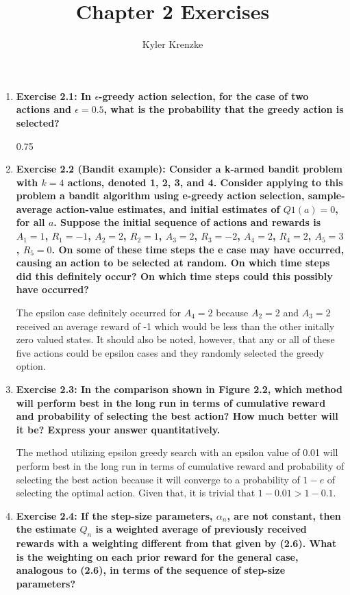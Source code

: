 \documentclass[11pt]{article}
\title{Chapter 2 Exercises}
\author{Kyler Krenzke}
\date{}
\begin{document}
	\maketitle

	\begin{enumerate}
		\item \textbf{Exercise 2.1: In $\epsilon$-greedy action selection, for the case of two actions and $\epsilon=0.5$, what is the probability that the greedy action is
		selected?}

		0.75
		
		\item \textbf{Exercise 2.2 (Bandit example): Consider a k-armed bandit problem with $k=4$ actions, denoted 1, 2, 3, and 4. Consider applying to this problem a bandit
		algorithm using e-greedy action selection, sample-average action-value estimates, and initial estimates of $Q1(a)=0$, for all $a$. Suppose the initial sequence of actions
		and rewards is $A_1=1$, $R_1=-1$, $A_2=2$, $R_2=1$, $A_3=2$, $R_3=-2$, $A_4=2$, $R_4=2$, $A_5=3$, $R_5=0$. On some of these time steps the e case may have occurred,
		causing an action to be selected at random. On which time steps did this definitely occur? On which time steps could this possibly have occurred?}

		The epsilon case definitely occurred for $A_4=2$ because $A_2=2$ and $A_3=2$ received an average reward of -1 which would be less than the other initally zero valued
		states. It should also be noted, however, that any or all of these five actions could be epsilon cases and they randomly selected the greedy option.
		
		\item \textbf{Exercise 2.3: In the comparison shown in Figure 2.2, which method will perform best in the long run in terms of cumulative reward and probability of
		selecting the best action? How much better will it be? Express your answer quantitatively.}
		
		The method utilizing epsilon greedy search with an epsilon value of 0.01 will perform best in the long run in terms of cumulative reward and probability of selecting the
		best action because it will converge to a probability of $1-e$ of selecting the optimal action. Given that, it is trivial that $1-0.01 > 1-0.1$.
		
		\item \textbf{Exercise 2.4: If the step-size parameters, $\alpha_n$, are not constant, then the estimate $Q_n$ is a weighted average of previously received rewards with a
		weighting different from that given by (2.6). What is the weighting on each prior reward for the general case, analogous to (2.6), in terms of the sequence of step-size
		parameters?}
		

\end{enumerate}
\end{document}
